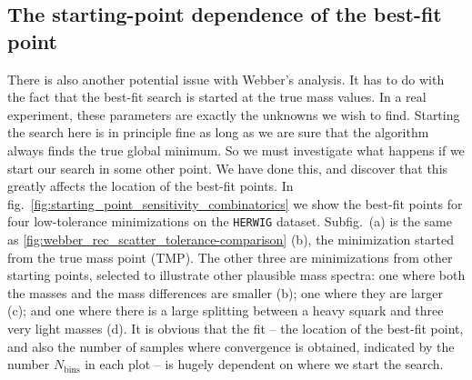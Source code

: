 \documentclass[twoside,english]{uiofysmaster}
\begin{document}
\subsection{The starting-point dependence of the best-fit point}

There is also another potential issue with Webber's analysis. It has to do with the fact that the best-fit search is started at the true mass values.  In a real experiment, these parameters are exactly the unknowns we wish to find. Starting the search here is in principle fine as long as we are sure that the algorithm always finds the true global minimum. So we must investigate what happens if we start our search in some other point. We have done this, and discover that this greatly affects the location of the best-fit points. In fig.\ \ref{fig:starting_point_sensitivity_combinatorics} we show the best-fit points for four low-tolerance minimizations on the {\tt HERWIG} dataset. Subfig.\ (a) is the same as \ref{fig:webber_rec_scatter_tolerance-comparison} (b), the minimization started from the true mass point (TMP). The other three are minimizations from other starting points, selected to illustrate other plausible mass spectra: one where both the masses and the mass differences are smaller (b); one where they are larger (c); and one where there is a large splitting between a heavy squark and three very light masses (d). It is obvious that the fit -- the location of the best-fit point, and also the number of samples where convergence is obtained, indicated by the number $N_\mathrm{bins}$ in each plot -- is hugely dependent on where we start the search.
\end{document}

